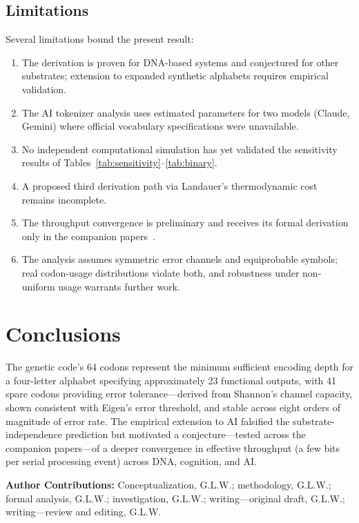 \documentclass[11pt]{article}
\begin{document}
\subsection{Limitations}

Several limitations bound the present result:
\begin{enumerate}
    \item The derivation is proven for DNA-based systems and conjectured for other substrates; extension to expanded synthetic alphabets requires empirical validation.
    \item The AI tokenizer analysis uses estimated parameters for two models (Claude, Gemini) where official vocabulary specifications were unavailable.
    \item No independent computational simulation has yet validated the sensitivity results of Tables~\ref{tab:sensitivity}--\ref{tab:binary}.
    \item A proposed third derivation path via Landauer's thermodynamic cost~\cite{landauer1961} remains incomplete.
    \item The throughput convergence is preliminary and receives its formal derivation only in the companion papers~\cite{whitmer2026rlf,whitmer2026tb}.
    \item The analysis assumes symmetric error channels and equiprobable symbols; real codon-usage distributions violate both, and robustness under non-uniform usage warrants further work.
\end{enumerate}

\section{Conclusions}

The genetic code's 64 codons represent the minimum sufficient encoding depth for a four-letter alphabet specifying approximately 23 functional outputs, with 41 spare codons providing error tolerance---derived from Shannon's channel capacity, shown consistent with Eigen's error threshold, and stable across eight orders of magnitude of error rate. The empirical extension to AI falsified the substrate-independence prediction but motivated a conjecture---tested across the companion papers---of a deeper convergence in effective throughput (a few bits per serial processing event) across DNA, cognition, and AI.

\vspace{1em}
\noindent\textbf{Author Contributions:} Conceptualization, G.L.W.; methodology, G.L.W.; formal analysis, G.L.W.; investigation, G.L.W.; writing---original draft, G.L.W.; writing---review and editing, G.L.W.
\end{document}
